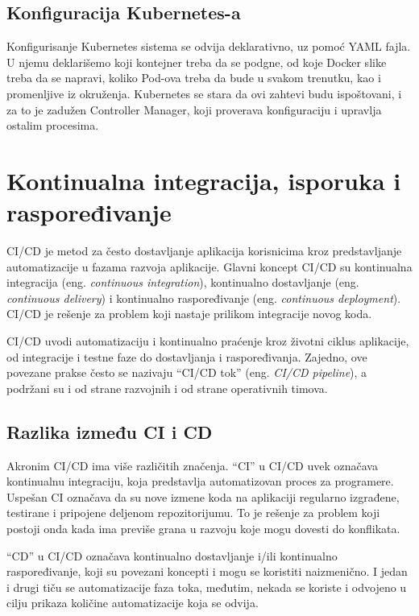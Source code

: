 \subsection{Konfiguracija Kubernetes-a}
Konfigurisanje Kubernetes sistema se odvija deklarativno, uz pomoć YAML fajla. U njemu deklarišemo
koji kontejner treba da se podgne, od koje Docker slike treba da se napravi, koliko Pod-ova treba 
da bude u svakom trenutku, kao i promenljive iz okruženja. Kubernetes se stara da ovi zahtevi budu 
ispoštovani, i za to je zadužen Controller Manager, koji proverava konfiguraciju i upravlja ostalim 
procesima. 

\section{Kontinualna integracija, isporuka i raspoređivanje}\label{sec:arhitektura-ci_cd}

CI/CD je metod za često dostavljanje aplikacija korisnicima kroz predstavljanje automatizacije u 
fazama razvoja aplikacije. Glavni koncept CI/CD su kontinualna integracija (eng. 
\textit{continuous integration}), kontinualno dostavljanje (eng. \textit{continuous delivery}) i 
kontinualno raspoređivanje (eng. \textit{continuous deployment}). CI/CD je rešenje za problem 
koji nastaje prilikom integracije novog koda.

CI/CD uvodi automatizaciju i kontinualno praćenje kroz životni ciklus aplikacije, 
od integracije i testne faze do dostavljanja i raspoređivanja. Zajedno, ove povezane prakse 
često se nazivaju “CI/CD tok” (eng. \textit{CI/CD pipeline}), a podržani su i od strane razvojnih 
i od strane operativnih timova.

\subsection{Razlika između CI i CD}
Akronim CI/CD ima više različitih značenja. “CI” u CI/CD uvek označava kontinualnu integraciju, 
koja predstavlja automatizovan proces za programere. Uspešan CI označava da su nove izmene koda 
na aplikaciji regularno izgrađene, testirane i pripojene deljenom repozitorijumu. To je rešenje 
za problem koji postoji onda kada ima previše grana u razvoju koje mogu dovesti do konflikata.

“CD” u CI/CD označava kontinualno dostavljanje i/ili kontinualno raspoređivanje, koji su povezani 
koncepti i mogu se koristiti naizmenično. I jedan i drugi tiču se automatizacije faza toka, međutim, 
nekada se koriste i odvojeno u cilju prikaza količine automatizacije koja se odvija.

